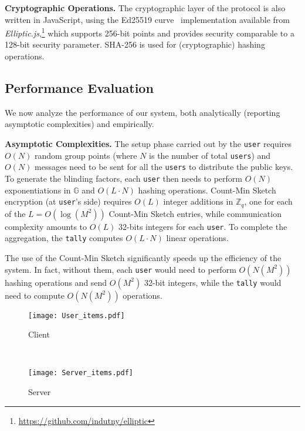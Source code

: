 \documentclass[conference]{IEEEtran}
\newcommand{\descr}[1]{\medskip \noindent \textbf{#1}}
\newcommand{\Zq}{\mathbb{Z}_q}
\newcommand{\BigO}[1]{\ensuremath{O(#1)}}
\newcommand{\user}{{\tt user}\xspace}
\newcommand{\users}{{\tt users}\xspace}
\newcommand{\tally}{{\tt tally}\xspace}
\begin{document}
\descr{Cryptographic Operations.} The cryptographic layer of the protocol is also written in JavaScript, using the Ed25519 curve~\cite{bernstein2011high} implementation available from \emph{Elliptic.js},\footnote{\url{https://github.com/indutny/elliptic}} which supports 256-bit points and provides security comparable to a 128-bit security parameter.
SHA-256 is used for (cryptographic) hashing operations. 

\subsection{Performance Evaluation}
\label{sec:performance}
We now analyze the performance of our system, both analytically (reporting asymptotic complexities) and empirically. 



\descr{Asymptotic Complexities.}
The setup phase carried out by the \user requires $\BigO{N}$ random group points  (where $N$ is the number of total \users) and $\BigO{N}$ messages need to be sent for all the \users to distribute the public keys.
To generate the blinding factors, each \user then needs to perform $\BigO{N}$ exponentiations in $\mathbb{G}$ 
and $\BigO{L \cdot N}$ hashing operations.
Count-Min Sketch encryption (at \user's side) requires $\BigO{L}$ integer additions in $\Zq$, one for each of the $L=\BigO{\log(M^2)}$ Count-Min Sketch entries, while communication complexity amounts to \BigO{L} 32-bits integers for each \user. To complete the aggregation, the \tally computes $\BigO{L \cdot N}$ linear operations. 


The use of the Count-Min Sketch significantly speeds up the efficiency of the system. In fact, without them, each \user would need to perform $\BigO{N(M^2)}$ hashing operations and send $\BigO{M^2}$ 32-bit integers, while the \tally would need to compute $\BigO{N(M^2)}$ operations. 



\begin{figure*}[t]
\centering
    \begin{subfigure}[t]{0.4\textwidth}
        \centering
		\texttt{[image: User\_items.pdf]}
        \caption{\label{fig:time_client_items} Client}
    \end{subfigure} 
~
    \begin{subfigure}[t]{0.4\textwidth}
        \centering
		\texttt{[image: Server\_items.pdf]}
        \caption{\label{fig:time_server_items} Server}
    \end{subfigure}\vspace{-0.3cm}
\caption{\label{fig:time_items} Execution time  for increasing number of programs (with 1,000 \users).}
\vspace{-0.5cm}
\end{figure*}
\end{document}
